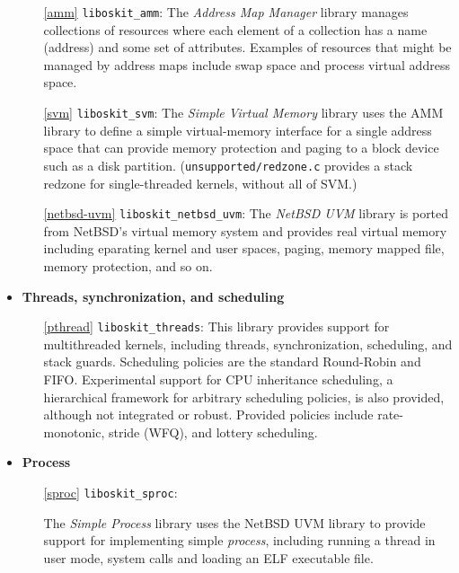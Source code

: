 \begin{itemize}
\begin{itemize}
\item[\ref{amm}]	{\tt liboskit_amm}:
	The \emph{Address Map Manager} library manages collections of resources
	where each element of a collection has a name (address) and some set of
	attributes.
	Examples of resources that might be managed by address maps include
	swap space and process virtual address space.

\item[\ref{svm}]	{\tt liboskit_svm}:
	The \emph{Simple Virtual Memory} library uses the AMM library
	to define a simple virtual-memory interface for a single
	address space that can provide memory protection and paging
	to a block device such as a disk partition.
	(\texttt{unsupported/redzone.c} provides a stack redzone
	for single-threaded kernels, without all of SVM.)

\item[\ref{netbsd-uvm}] {\tt liboskit_netbsd_uvm}: 
        The \emph{NetBSD UVM} library is ported from NetBSD's virtual
        memory system and provides real virtual memory including
        eparating kernel and user spaces, paging, memory mapped file, memory
        protection, and so on.
\end{itemize}


\item {\bf Threads, synchronization, and scheduling}
\begin{itemize}
\item[\ref{pthread}]	{\tt liboskit_threads}:
	This library provides support for multithreaded kernels,
	including \posix{} threads, synchronization, scheduling,
	and stack guards.
	Scheduling policies are the standard \posix{} Round-Robin
	and FIFO\@.
	Experimental support for CPU inheritance scheduling, a hierarchical
	framework for arbitrary scheduling policies, is also provided,
	although not integrated or robust.  Provided policies include
	rate-monotonic, stride (WFQ), and lottery scheduling.
\end{itemize}

\item {\bf Process}
\begin{itemize}
\item[\ref{sproc}]    {\tt liboskit_sproc}:

        The \emph{Simple Process} library uses the NetBSD UVM library
        to provide support for implementing simple \emph{process},
        including running a thread in user mode, system calls and
        loading an ELF executable file.
\end{itemize}


\end{itemize}

